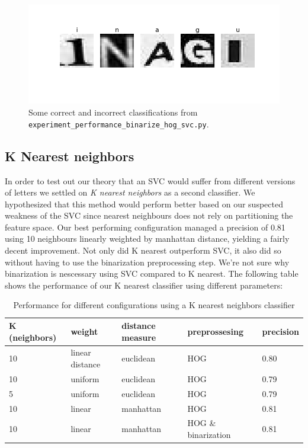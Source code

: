 \documentclass[paper=a4, fontsize=11pt]{scrartcl} %
\numberwithin{equation}{section} %
\numberwithin{figure}{section} %
\numberwithin{table}{section} %
\begin{document}
\begin{figure}[H]
    \centering
    \includegraphics[width=0.4\linewidth]{img/test}
    \caption{Some correct and incorrect classifications from \texttt{experiment\_performance\_binarize\_hog\_svc.py}.}
\end{figure}

\subsection{K Nearest neighbors}
In order to test out our theory that an SVC would suffer from
different versions of letters we settled on \textit{K nearest neighbors} as a
second classifier.  We hypothesized that this method would perform
better based on our suspected weakness of the SVC since nearest
neighbours does not rely on partitioning the feature space.  Our best
performing configuration managed a precision of 0.81 using 10
neighbours linearly weighted by manhattan distance, yielding a fairly
decent improvement.  Not only did K nearest outperform SVC, it also
did so without having to use the binarization preprocessing step.
We're not sure why binarization is nescessary using SVC compared to K
nearest.
The following table shows the
performance of our K nearest classifier using different parameters:

\begin{table}[H]
    \centering
    \begin{tabular}{l | l | l | l | l}
        K (neighbors) & weight & distance measure & preprossesing & precision\\ \hline
        10 & linear distance & euclidean & HOG & 0.80\\ \hline
        10 & uniform & euclidean & HOG & 0.79\\ \hline
        5 & uniform & euclidean & HOG & 0.79\\ \hline
        10 & linear & manhattan & HOG & 0.81\\ \hline
        10 & linear & manhattan & HOG \& binarization & 0.81\\
    \end{tabular}
    \caption{Performance for different configurations using a K nearest neighbors classifier}
\end{table}
\end{document}
